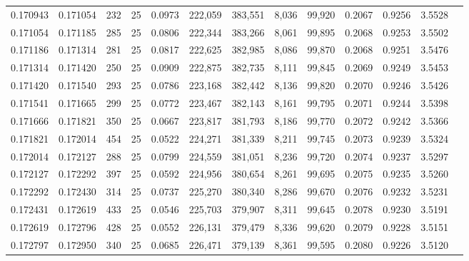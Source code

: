 \begin{tabular}{rrrrrrrrrrrrr}
0.170943 & 0.171054 &   232 &  25 &                                     0.0973 & 222,059 & 383,551 &   8,036 &  99,920 & 0.2067 & 0.9256 & 3.5528 \\
0.171054 & 0.171185 &   285 &  25 &                                     0.0806 & 222,344 & 383,266 &   8,061 &  99,895 & 0.2068 & 0.9253 & 3.5502 \\
0.171186 & 0.171314 &   281 &  25 &                                     0.0817 & 222,625 & 382,985 &   8,086 &  99,870 & 0.2068 & 0.9251 & 3.5476 \\
0.171314 & 0.171420 &   250 &  25 &                                     0.0909 & 222,875 & 382,735 &   8,111 &  99,845 & 0.2069 & 0.9249 & 3.5453 \\
0.171420 & 0.171540 &   293 &  25 &                                     0.0786 & 223,168 & 382,442 &   8,136 &  99,820 & 0.2070 & 0.9246 & 3.5426 \\
0.171541 & 0.171665 &   299 &  25 &                                     0.0772 & 223,467 & 382,143 &   8,161 &  99,795 & 0.2071 & 0.9244 & 3.5398 \\
0.171666 & 0.171821 &   350 &  25 &                                     0.0667 & 223,817 & 381,793 &   8,186 &  99,770 & 0.2072 & 0.9242 & 3.5366 \\
0.171821 & 0.172014 &   454 &  25 &                                     0.0522 & 224,271 & 381,339 &   8,211 &  99,745 & 0.2073 & 0.9239 & 3.5324 \\
0.172014 & 0.172127 &   288 &  25 &                                     0.0799 & 224,559 & 381,051 &   8,236 &  99,720 & 0.2074 & 0.9237 & 3.5297 \\
0.172127 & 0.172292 &   397 &  25 &                                     0.0592 & 224,956 & 380,654 &   8,261 &  99,695 & 0.2075 & 0.9235 & 3.5260 \\
0.172292 & 0.172430 &   314 &  25 &                                     0.0737 & 225,270 & 380,340 &   8,286 &  99,670 & 0.2076 & 0.9232 & 3.5231 \\
0.172431 & 0.172619 &   433 &  25 &                                     0.0546 & 225,703 & 379,907 &   8,311 &  99,645 & 0.2078 & 0.9230 & 3.5191 \\
0.172619 & 0.172796 &   428 &  25 &                                     0.0552 & 226,131 & 379,479 &   8,336 &  99,620 & 0.2079 & 0.9228 & 3.5151 \\
0.172797 & 0.172950 &   340 &  25 &                                     0.0685 & 226,471 & 379,139 &   8,361 &  99,595 & 0.2080 & 0.9226 & 3.5120 \\

\end{tabular}
